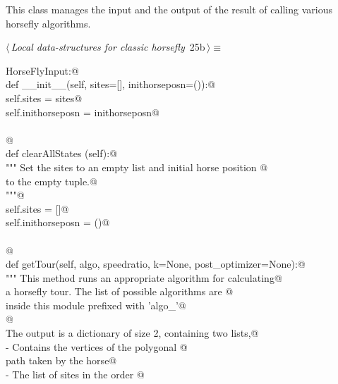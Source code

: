 \documentclass[11.5pt]{report}
\begin{document}
\newchunk This class manages the input and the output of the result of 
calling various horsefly algorithms. 

\begin{flushleft} \small\label{scrap21}\raggedright\small
{} $\langle\,${\itshape Local data-structures for classic horsefly}\nobreak\ {\footnotesize {25b}}$\,\rangle\equiv$
\vspace{-1ex}
\begin{list}{}{} \item
\mbox{}\verb@class HorseFlyInput:@\\
\mbox{}\verb@      def __init__(self, sites=[], inithorseposn=()):@\\
\mbox{}\verb@           self.sites         = sites@\\
\mbox{}\verb@           self.inithorseposn = inithorseposn@\\
\mbox{}\verb@@\\
\mbox{}\verb@           @\\
\mbox{}\verb@      def clearAllStates (self):@\\
\mbox{}\verb@          """ Set the sites to an empty list and initial horse position @\\
\mbox{}\verb@          to the empty tuple.@\\
\mbox{}\verb@          """@\\
\mbox{}\verb@          self.sites = []@\\
\mbox{}\verb@          self.inithorseposn = ()@\\
\mbox{}\verb@@\\
\mbox{}\verb@          @\\
\mbox{}\verb@      def getTour(self, algo, speedratio, k=None, post_optimizer=None):@\\
\mbox{}\verb@          """ This method runs an appropriate algorithm for calculating@\\
\mbox{}\verb@          a horsefly tour. The list of possible algorithms are @\\
\mbox{}\verb@          inside this module prefixed with 'algo_'@\\
\mbox{}\verb@          @\\
\mbox{}\verb@          The output is a dictionary of size 2, containing two lists,@\\
\mbox{}\verb@          - Contains the vertices of the polygonal @\\
\mbox{}\verb@            path taken by the horse@\\
\mbox{}\verb@          - The list of sites in the order @\\

\end{list}
\end{flushleft}
\end{document}
